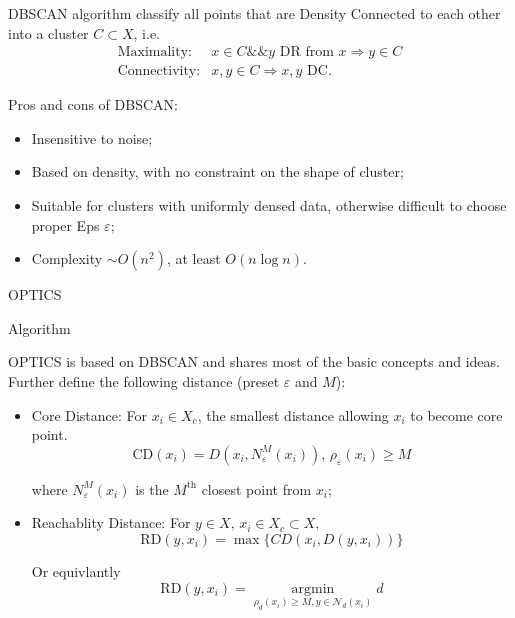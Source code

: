    DBSCAN algorithm classify all points that are Density Connected to each other into a cluster $ C\subset X $, i.e.
    \begin{align*}
        \text{Maximality:}& x\in C\&\& y\text{ DR from } x \Rightarrow y\in C\\
        \text{Connectivity:}& x,y\in C\Rightarrow x,y\text{ DC}.
    \end{align*} 
        
    Pros and cons of DBSCAN:
\begin{itemize}[topsep=2pt,itemsep=2pt]
    \item Insensitive to noise;
    \item Based on density, with no constraint on the shape of cluster; 
    \item Suitable for clusters with uniformly densed data, otherwise difficult to choose proper Eps $ \varepsilon  $;
    \item Complexity $ \sim O(n^2) $, at least $ O(n\log n) $.
\end{itemize}


\begin{point}
    \hypertarget{OPTICS}{OPTICS} Algorithm
\end{point}

    OPTICS is based on DBSCAN and shares most of the basic concepts and ideas. Further define the following distance (preset $ \varepsilon  $ and $ M $):
    \begin{itemize}[topsep=2pt,itemsep=2pt]
        \item Core Distance: For $ x_i\in X_c $, the smallest distance allowing $ x_i $ to become core point.
        \begin{equation}
            \mathrm{CD}(x_i)=D(x_i,N^M_\varepsilon (x_i)),\, \rho _\varepsilon (x_i)\geq M
        \end{equation}

        where $ N^M_\varepsilon (x_i) $ is the $ M^\mathrm{th} $ closest point from $ x_i $;
        \item Reachablity Distance: For $ y\in X,\,x_i \in X_c\subset X$, 
        \begin{equation}
            \mathrm{RD}(y,x_i)=\max\{CD(x_i,D(y,x_i))\}
        \end{equation}

        Or equivlantly
        \begin{equation}
            \mathrm{RD}(y,x_i)=\mathop{\arg\min}\limits_{\rho _d(x_i)\geq M, y\in \mathcal{N}_d(x_i)}  d
        \end{equation}
        
        
    \end{itemize}
    
